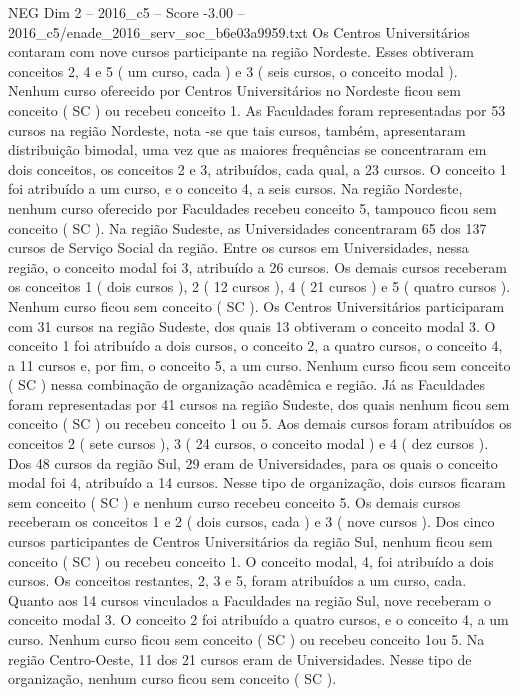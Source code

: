 \begin{textsample}{NEG Dim 2 – 2016\_c5 – Score -3.00 – 2016\_c5/enade\_2016\_serv\_soc\_b6e03a9959.txt}
Os Centros Universitários contaram com nove cursos participante na região Nordeste.
Esses obtiveram conceitos 2, 4 e 5 ( um curso, cada ) e 3 ( seis cursos, o conceito modal ).
Nenhum curso oferecido por Centros Universitários no Nordeste ficou sem conceito ( SC ) ou recebeu conceito 1.
As Faculdades foram representadas por 53 cursos na região Nordeste, nota -se que tais cursos, também, apresentaram distribuição bimodal, uma vez que as maiores frequências se concentraram em dois conceitos, os conceitos 2 e 3, atribuídos, cada qual, a 23 cursos.
O conceito 1 foi atribuído a um curso, e o conceito 4, a seis cursos.
Na região Nordeste, nenhum curso oferecido por Faculdades recebeu conceito 5, tampouco ficou sem conceito ( SC ).
Na região Sudeste, as Universidades concentraram 65 dos 137 cursos de Serviço Social da região.
Entre os cursos em Universidades, nessa região, o conceito modal foi 3, atribuído a 26 cursos.
Os demais cursos receberam os conceitos 1 ( dois cursos ), 2 ( 12 cursos ), 4 ( 21 cursos ) e 5 ( quatro cursos ).
Nenhum curso ficou sem conceito ( SC ).
Os Centros Universitários participaram com 31 cursos na região Sudeste, dos quais 13 obtiveram o conceito modal 3.
O conceito 1 foi atribuído a dois cursos, o conceito 2, a quatro cursos, o conceito 4, a 11 cursos e, por fim, o conceito 5, a um curso.
Nenhum curso ficou sem conceito ( SC ) nessa combinação de organização acadêmica e região.
Já as Faculdades foram representadas por 41 cursos na região Sudeste, dos quais nenhum ficou sem conceito ( SC ) ou recebeu conceito 1 ou 5.
Aos demais cursos foram atribuídos os conceitos 2 ( sete cursos ), 3 ( 24 cursos, o conceito modal ) e 4 ( dez cursos ).
Dos 48 cursos da região Sul, 29 eram de Universidades, para os quais o conceito modal foi 4, atribuído a 14 cursos.
Nesse tipo de organização, dois cursos ficaram sem conceito ( SC ) e nenhum curso recebeu conceito 5.
Os demais cursos receberam os conceitos 1 e 2 ( dois cursos, cada ) e 3 ( nove cursos ).
Dos cinco cursos participantes de Centros Universitários da região Sul, nenhum ficou sem conceito ( SC ) ou recebeu conceito 1.
O conceito modal, 4, foi atribuído a dois cursos.
Os conceitos restantes, 2, 3 e 5, foram atribuídos a um curso, cada.
Quanto aos 14 cursos vinculados a Faculdades na região Sul, nove receberam o conceito modal 3.
O conceito 2 foi atribuído a quatro cursos, e o conceito 4, a um curso.
Nenhum curso ficou sem conceito ( SC ) ou recebeu conceito 1ou 5.
Na região Centro-Oeste, 11 dos 21 cursos eram de Universidades.
Nesse tipo de organização, nenhum curso ficou sem conceito ( SC ).

\end{textsample}
